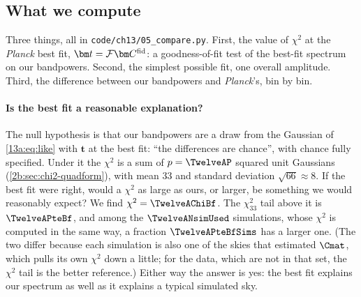 \subsection{What we compute}
\label{13a:sec:compare-what}

Three things, all in \texttt{code/ch13/05\_compare.py}. First, the value of $\chi^2$ at the \textit{Planck} best
fit, $\bm t=\mathcal F\bm C^{\rm fid}$: a goodness-of-fit test of the best-fit spectrum on our bandpowers. Second,
the simplest possible fit, one overall amplitude. Third, the difference between our bandpowers and
\textit{Planck}'s, bin by bin.

\paragraph{Is the best fit a reasonable explanation?} The null hypothesis is that our bandpowers are a draw
from the Gaussian of \eqref{13a:eq:like} with $\bm t$ at the best fit: ``the differences are chance'', with
chance fully specified. Under it the $\chi^2$ is a sum of $p=\TwelveAP$ squared unit Gaussians
(\cref{2b:sec:chi2-quadform}), with mean $33$ and standard deviation $\sqrt{66}\approx8$. If the best fit were right,
would a $\chi^2$ as large as ours, or larger, be something we would reasonably expect? We find
$\chi^2=\TwelveAChiBf$. The $\chi^2_{33}$ tail above it is $\TwelveAPteBf$, and among the $\TwelveANsimUsed$
simulations, whose $\chi^2$ is computed in the same way, a fraction $\TwelveAPteBfSims$ has a larger one. (The two
differ because each simulation is also one of the skies that estimated $\Cmat$, which pulls its own $\chi^2$ down
a little; for the data, which are not in that set, the $\chi^2$ tail is the better reference.) Either way the answer
is yes: the best fit explains our spectrum as well as it explains a typical simulated sky.

